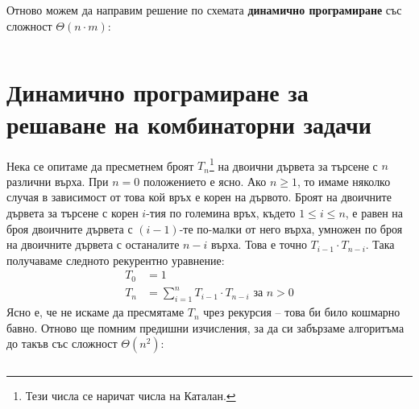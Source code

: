 \documentclass{article}
\theoremstyle{definition}
\theoremstyle{plain}
\theoremstyle{remark}
\theoremstyle{definition}
\begin{document}
\pagebreak

Отново можем да направим решение по схемата \textbf{динамично програмиране} със сложност $\Theta(n \cdot m)$:
\inputminted[linenos]{c++}{algorithms/longest_common_subsequence.cpp}

\section*{Динамично програмиране за решаване на комбинаторни задачи}

Нека се опитаме да пресметнем броят $T_n$\footnote{Тези числа се наричат числа на Каталан.} на двоични дървета за търсене с $n$ различни върха.
При $n = 0$ положението е ясно.
Ако $n \geq 1$, то имаме няколко случая в зависимост от това кой връх е корен на дървото.
Броят на двоичните дървета за търсене с корен $i$-тия по големина връх, където $1 \leq i \leq n$, е равен на броя двоичните дървета с $(i - 1)$-те по-малки от него върха, умножен по броя на двоичните дървета с останалите $n - i$ върха.
Това е точно $T_{i - 1} \cdot T_{n - i}$.
Така получаваме следното рекурентно уравнение:
\begin{align*}
    T_0 & = 1                                                                 \\
    T_n & = \sum\limits_{i = 1}^n T_{i - 1} \cdot T_{n - i} \text{ за } n > 0
\end{align*}
Ясно е, че не искаме да пресмятаме $T_n$ чрез рекурсия -- това би било кошмарно бавно.
Отново ще помним предишни изчисления, за да си забързаме алгоритъма до такъв със сложност $\Theta(n^2)$:
\inputminted[linenos]{c++}{algorithms/catalan.cpp}
\end{document}
